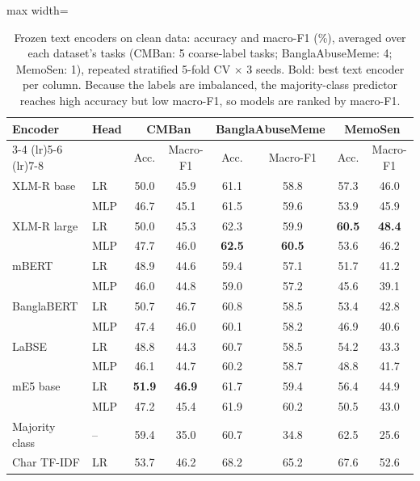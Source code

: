 \begin{table}[t]
\centering
\small
\caption{Frozen text encoders on clean data: accuracy and macro-F1 (\%), averaged over each dataset's tasks (CMBan: 5 coarse-label tasks; BanglaAbuseMeme: 4; MemoSen: 1), repeated stratified 5-fold CV $\times$ 3 seeds. Bold: best text encoder per column. Because the labels are imbalanced, the majority-class predictor reaches high accuracy but low macro-F1, so models are ranked by macro-F1.}
\label{tab:text_encoders}
\begin{adjustbox}{max width=\textwidth}
\begin{tabular}{llcccccc}
\toprule
Encoder & Head & \multicolumn{2}{c}{CMBan} & \multicolumn{2}{c}{BanglaAbuseMeme} & \multicolumn{2}{c}{MemoSen} \\
\cmidrule(lr){3-4} \cmidrule(lr){5-6} \cmidrule(lr){7-8}
 & & Acc. & Macro-F1 & Acc. & Macro-F1 & Acc. & Macro-F1 \\
\midrule
XLM-R base & LR & 50.0 & 45.9 & 61.1 & 58.8 & 57.3 & 46.0 \\
 & MLP & 46.7 & 45.1 & 61.5 & 59.6 & 53.9 & 45.9 \\
\addlinespace[2pt]
XLM-R large & LR & 50.0 & 45.3 & 62.3 & 59.9 & \textbf{60.5} & \textbf{48.4} \\
 & MLP & 47.7 & 46.0 & \textbf{62.5} & \textbf{60.5} & 53.6 & 46.2 \\
\addlinespace[2pt]
mBERT & LR & 48.9 & 44.6 & 59.4 & 57.1 & 51.7 & 41.2 \\
 & MLP & 46.0 & 44.8 & 59.0 & 57.2 & 45.6 & 39.1 \\
\addlinespace[2pt]
BanglaBERT & LR & 50.7 & 46.7 & 60.8 & 58.5 & 53.4 & 42.8 \\
 & MLP & 47.4 & 46.0 & 60.1 & 58.2 & 46.9 & 40.6 \\
\addlinespace[2pt]
LaBSE & LR & 48.8 & 44.3 & 60.7 & 58.5 & 54.2 & 43.3 \\
 & MLP & 46.1 & 44.7 & 60.2 & 58.7 & 48.8 & 41.7 \\
\addlinespace[2pt]
mE5 base & LR & \textbf{51.9} & \textbf{46.9} & 61.7 & 59.4 & 56.4 & 44.9 \\
 & MLP & 47.2 & 45.4 & 61.9 & 60.2 & 50.5 & 43.0 \\
\midrule
Majority class & -- & 59.4 & 35.0 & 60.7 & 34.8 & 62.5 & 25.6 \\
Char TF-IDF & LR & 53.7 & 46.2 & 68.2 & 65.2 & 67.6 & 52.6 \\
\bottomrule
\end{tabular}
\end{adjustbox}
\end{table}
